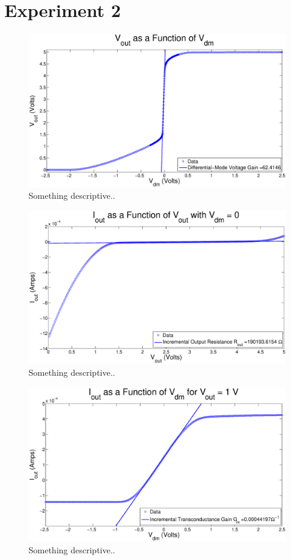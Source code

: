\documentclass{article}
\begin{document}
\section*{Experiment 2}

\begin{figure}[H]
\centering
\includegraphics[width=\linewidth]{../Figures/Exp2P1.eps}
\caption{Something descriptive..}
\label{fig:exp2p1}
\end{figure}

\begin{figure}[H]
\centering
\includegraphics[width=\linewidth]{../Figures/Exp2P2.eps}
\caption{Something descriptive..}
\label{fig:exp2p2}
\end{figure}

\begin{figure}[H]
\centering
\includegraphics[width=\linewidth]{../Figures/Exp2P3.eps}
\caption{Something descriptive..}
\label{fig:exp2p3}
\end{figure}
\end{document}
